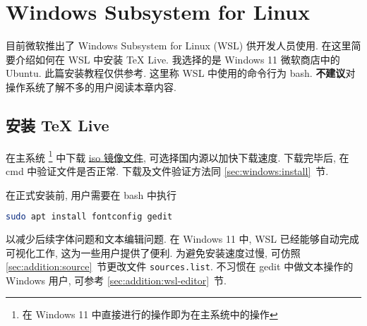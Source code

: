 
\chapter{Windows Subsystem for Linux}

目前微软推出了 Windows Subsystem for Linux (WSL) 供开发人员使用.
在这里简要介绍如何在 WSL 中安装 \TeX{} Live.
我选择的是 Windows 11 微软商店中的 Ubuntu.
此篇安装教程仅供参考.
这里称 WSL 中使用的命令行为 \textsf{bash}.
\textbf{不建议}对操作系统了解不多的用户阅读本章内容.

\section{安装 \TeX{} Live}

在主系统%
\footnote{在 Windows 11 中直接进行的操作即为在主系统中的操作}%
中下载
\href{https://mirrors.ctan.org/systems/texlive/Images/texlive2025.iso}{iso 镜像文件},
可选择国内源以加快下载速度.
下载完毕后, 在 \textsf{cmd} 中验证文件是否正常.
下载及文件验证方法同 \ref{sec:windows:install}~节.

在正式安装前,
用户需要在 \textsf{bash} 中执行
\begin{lstlisting}[language=bash]
  sudo apt install fontconfig gedit
\end{lstlisting}
以减少后续字体问题和文本编辑问题.
在 Windows 11 中,
WSL 已经能够自动完成可视化工作,
这为一些用户提供了便利.
为避免安装速度过慢,
可仿照 \ref{sec:addition:source}~节更改文件 \texttt{sources.list}.
不习惯在 \textsf{gedit} 中做文本操作的 Windows 用户,
可参考 \ref{sec:addition:wsl-editor}~节.


